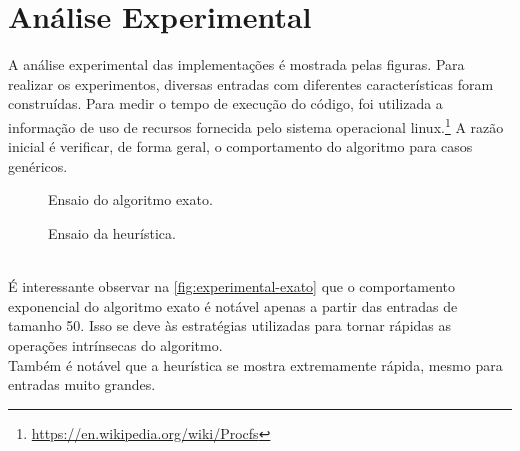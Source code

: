 \documentclass{article}
\begin{document}
\section{Análise Experimental}
A análise experimental das implementações é mostrada pelas figuras. Para realizar os experimentos, diversas entradas com diferentes características foram construídas. Para medir o tempo de execução do código, foi utilizada a informação de uso de recursos fornecida pelo sistema operacional linux.\footnote{\url{https://en.wikipedia.org/wiki/Procfs}} A razão inicial é verificar, de forma geral, o comportamento do algoritmo para casos genéricos.
\begin{figure}[h]
  \centering
  
  
  \caption{Ensaio do algoritmo exato.}
  \label{fig:experimental-exato}
\end{figure}
\vspace{-10pt}
\begin{figure}[h]
  \centering
  
  
  \caption{Ensaio da heurística.}
\end{figure} \\
É interessante observar na \autoref{fig:experimental-exato} que o comportamento exponencial do algoritmo exato é notável apenas a partir das entradas de tamanho 50. Isso se deve às estratégias utilizadas para tornar rápidas as operações intrínsecas do algoritmo.
\\[5pt]
Também é notável que a heurística se mostra extremamente rápida, mesmo para entradas muito grandes.


\pagebreak
\end{document}
